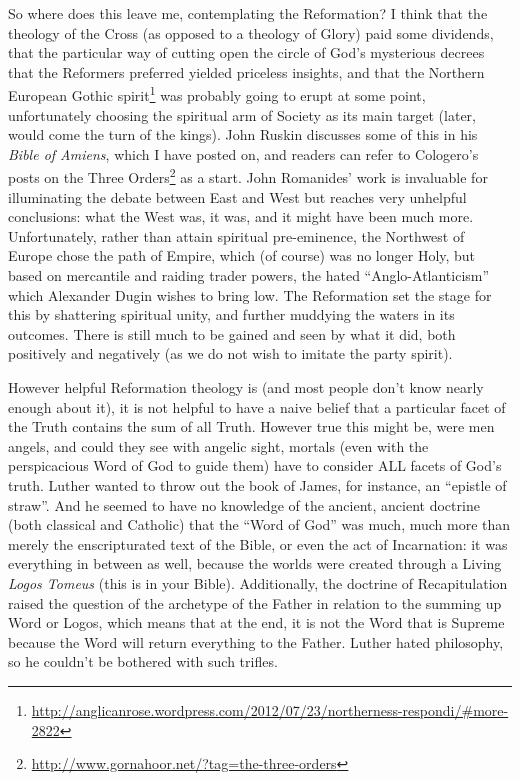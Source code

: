 So where does this leave me, contemplating the Reformation? I think that the theology of the Cross (as opposed to a theology of Glory) paid some dividends, that the particular way of cutting open the circle of God's mysterious decrees that the Reformers preferred yielded priceless insights, and that the Northern European Gothic spirit\footnote{\url{http://anglicanrose.wordpress.com/2012/07/23/northerness-respondi/\#more-2822}} was probably going to erupt at some point, unfortunately choosing the spiritual arm of Society as its main target (later, would come the turn of the kings). John Ruskin discusses some of this in his \textit{Bible of Amiens}, which I have posted on, and readers can refer to Cologero's posts on the Three Orders\footnote{\url{http://www.gornahoor.net/?tag=the-three-orders}} as a start. John Romanides' work is invaluable for illuminating the debate between East and West but reaches very unhelpful conclusions: what the West was, it was, and it might have been much more. Unfortunately, rather than attain spiritual pre-eminence, the Northwest of Europe chose the path of Empire, which (of course) was no longer Holy, but based on mercantile and raiding trader powers, the hated ``Anglo-Atlanticism'' which Alexander Dugin wishes to bring low. The Reformation set the stage for this by shattering spiritual unity, and further muddying the waters in its outcomes. There is still much to be gained and seen by what it did, both positively and negatively (as we do not wish to imitate the party spirit).

However helpful Reformation theology is (and most people don't know nearly enough about it), it is not helpful to have a naive belief that a particular facet of the Truth contains the sum of all Truth. However true this might be, were men angels, and could they see with angelic sight, mortals (even with the perspicacious Word of God to guide them) have to consider ALL facets of God's truth. Luther wanted to throw out the book of James, for instance, an ``epistle of straw''. And he seemed to have no knowledge of the ancient, ancient doctrine (both classical and Catholic) that the ``Word of God'' was much, much more than merely the enscripturated text of the Bible, or even the act of Incarnation: it was everything in between as well, because the worlds were created through a Living \emph{Logos Tomeus} (this is in your Bible). Additionally, the doctrine of Recapitulation raised the question of the archetype of the Father in relation to the summing up Word or Logos, which means that at the end, it is not the Word that is Supreme because the Word will return everything to the Father. Luther hated philosophy, so he couldn't be bothered with such trifles.

